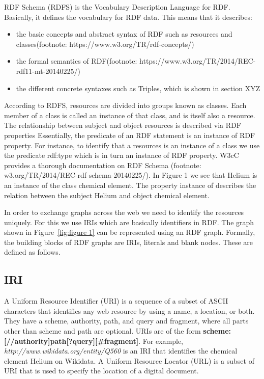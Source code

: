 RDF Schema (RDFS) is the Vocabulary Description Language for RDF. Basically, it defines the vocabulary for RDF data. This means that it describes:

\begin{itemize}
	\item the basic concepts and abstract syntax of RDF such as resources and classes(footnote: https://www.w3.org/TR/rdf-concepts/)
	\item the formal semantics of RDF(footnote: https://www.w3.org/TR/2014/REC-rdf11-mt-20140225/)
	\item the different concrete syntaxes such as Triples, which is shown in section XYZ 
\end{itemize}

According to RDFS, resources are divided into groups known as classes. Each member of a class is called an instance of that class, and is itself also a resource. The relationship between subject and object resources is described via RDF properties Essentially, the predicate of an RDF statement is an instance of RDF property. For instance, to identify that a resources is an instance of a class we use the predicate rdf:type which is in turn an instance of RDF property. W3cC provides a thorough documentation on RDF Schema (footnote: w3.org/TR/2014/REC-rdf-schema-20140225/). In Figure 1 we see that Helium is an instance of the class chemical element. The property instance of describes the relation between the subject Helium and object chemical element.

In order to exchange graphs across the web we need to identify the resources uniquely. For this we use IRIs which are basically identifiers in RDF. The graph shown in Figure~\ref{fig:figure 1} can be represented using an RDF graph. Formally, the building blocks of RDF graphs are IRIs, literals and blank nodes. These are defined as follows.

\subsection*{IRI}
A Uniform Resource Identifier (\acrshort{URI}) is a sequence of a subset of ASCII characters that identifies any web resource by using a name, a location, or both. They have a scheme, authority, path, and query and fragment, where all parts other than scheme and path are optional. URIs are of the form \textbf{scheme:[//authority]path[?query][\#fragment]}. For example, \textit{http://www.wikidata.org/entity/Q560} is an IRI that identifies the chemical element Helium on Wikidata. A Uniform Resource Locator (\acrshort{URL}) is a subset of URI that is used to specify the location of a digital document.

